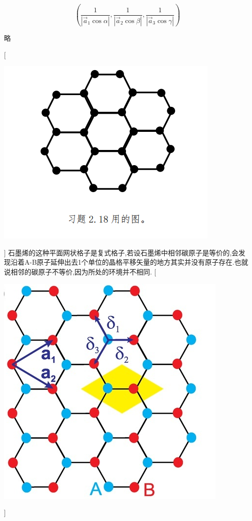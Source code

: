 \documentclass[UTF8,12pt, a4paper, oneside]{ctexart}
\begin{document}
    {\[(\dfrac{1}{|\vec{a}_1 \cos \alpha|},\dfrac{1}{|\vec{a}_2 \cos \beta|},\dfrac{1}{|\vec{a}_3 \cos \gamma|})\]}

    {略}

    [ \begin{center} \includegraphics{picture/2-19-1.png}\end{center}]
    {石墨烯的这种平面网状格子是复式格子,若设石墨烯中相邻碳原子是等价的,会发现沿着A-B原子延伸出去1个单位的晶格平移矢量的地方其实并没有原子存在.也就说相邻的碳原子不等价,因为所处的环境并不相同.}
    [ \begin{center}\includegraphics[scale=0.5]{picture/2-19-2.png} \end{center}]
        
\end{document}
